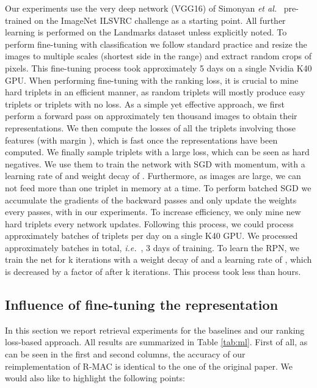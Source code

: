\documentclass[runningheads]{llncs}
\newcommand{\myparagraph}[1]{\noindent {\bf #1.}}
\def\etal{\emph{et al.}~}
\def\ie{\emph{i.e.}~}
\begin{document}
\myparagraph{Experimental details}
Our experiments use the very deep network (VGG16) of Simonyan \etal \cite{Simonyan2014} pre-trained on the ImageNet ILSVRC challenge as a starting point.
All further learning is performed on the Landmarks dataset unless explicitly noted.
To perform fine-tuning with classification \cite{Babenko2014} we follow standard practice and resize the images to
multiple scales (shortest side in the  range) and extract random crops of  pixels.
This fine-tuning process took approximately 5 days on a single Nvidia K40 GPU.
When performing fine-tuning with the ranking loss, it is crucial to mine hard triplets in an efficient manner, as random triplets will mostly produce easy triplets or triplets with no loss. 
As a simple yet effective approach, we first perform a forward pass on approximately ten thousand images to obtain their
representations. We then compute the losses of all the triplets involving those features (with margin ), which is
fast once the representations have been computed. 
We finally sample triplets with a large loss, which can be seen as hard negatives. We use them to train the network with SGD with momentum, with a learning rate of  and weight decay of . 
Furthermore, as images are large, we can not feed more than one triplet in memory at a time.
To perform batched SGD we accumulate the gradients of the backward passes and only update the weights every  passes, with  in our experiments. 
To increase efficiency, we only mine new hard triplets every  network updates. 
Following this process, we could process approximately  batches of  triplets per day on a single K40 GPU.
We processed approximately  batches in total, \ie, 3 days of training.
To learn the RPN, we train the net for k iterations with a weight decay of  and a learning rate of , which is decreased by a factor of  after k iterations.
This process took less than  hours.


\subsection{Influence of fine-tuning the representation}
\label{sec:exp-ml}

In this section we report retrieval experiments for the baselines and our ranking loss-based approach.
All results are summarized in Table \ref{tab:ml}.
First of all, as can be seen in the first and second columns, the accuracy of our reimplementation of R-MAC is
identical to the one of the original paper.  We would also like to highlight the following points:
\end{document}
